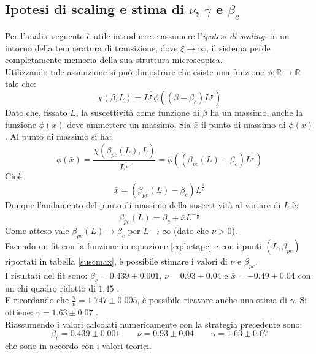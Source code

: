 \documentclass[10pt,a4paper]{article}
\begin{document}
\subsection*{Ipotesi di scaling e stima di $\nu$, $\gamma$ e $\beta_c$}
Per l'analisi seguente è utile introdurre e assumere l'\emph{ipotesi di scaling}: in un intorno della temperatura di transizione, dove $\xi\rightarrow\infty$, il sistema perde completamente memoria della sua struttura microscopica.\\
Utilizzando tale assunzione si può dimostrare che esiste una funzione $\phi:\mathbb{R}\rightarrow\mathbb{R}$ tale che:
\begin{equation*}
\chi(\beta,L)= L^{\frac{\gamma}{\nu}}\phi\left((\beta-\beta_c)L^{\frac{1}{\nu}}\right)
\end{equation*}
Dato che, fissato $L$, la suscettività come funzione di $\beta$ ha un massimo, anche la funzione $\phi(x)$ deve ammettere un massimo. Sia $\bar{x}$ il punto di massimo di $\phi(x)$. Al punto di massimo si ha:
\begin{equation*}
\phi(\bar{x})=\frac{\chi(\beta_{pc}(L),L)}{L^{\frac{\gamma}{\nu}}}=\phi\left((\beta_{pc}(L)-\beta_c)L^{\frac{1}{\nu}}\right)
\end{equation*}
Cioè:
\begin{equation*}
\bar{x}= \left(\beta_{pc}(L)-\beta_c\right)L^{\frac{1}{\nu}}
\end{equation*}
Dunque l'andamento del punto di massimo della suscettività al variare di $L$ è:
\begin{equation}
\beta_{pc}(L)= \beta_c+\bar{x}L^{-\frac{1}{\nu}}
\label{eq:betapc}
\end{equation}
Come atteso vale $\beta_{pc}(L)\rightarrow\beta_c$ per $L\rightarrow\infty$ (dato che $\nu>0$).\\
Facendo un fit con la funzione in equazione \ref{eq:betapc} e con i punti $(L,\beta_{pc})$ riportati in tabella \ref{suscmax}, è possibile stimare i valori di $\nu$ e $\beta_{pc}$.\\%
I risultati del fit sono: $\beta_c=0.439\pm0.001$, $\nu=0.93\pm 0.04$ e $\bar{x}=-0.49\pm0.04$ con un chi quadro ridotto di $1.45$ . \\
E ricordando che $\frac{\gamma}{\nu}=1.747\pm 0.005$, è possibile ricavare anche una stima di $\gamma$. Si ottiene: $\gamma=1.63\pm 0.07$ .\\ Riassumendo i valori calcolati numericamente con la strategia precedente sono:\\
\begin{equation*}
\beta_c=0.439\pm0.001  \qquad \nu=0.93\pm 0.04 \qquad \gamma=1.63\pm 0.07
\end{equation*}
che sono in accordo con i valori teorici.
\end{document}
